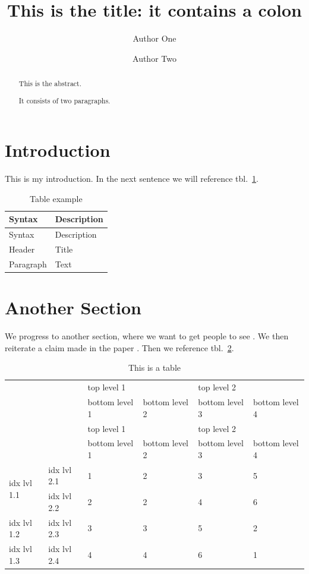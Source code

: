 \documentclass[
]{article}
\title{This is the title: it contains a colon}
\author{Author One \and Author Two}
\date{}
\begin{document}
\maketitle
\begin{abstract}
This is the abstract.

It consists of two paragraphs.
\end{abstract}

\hypertarget{introduction}{%
\section{Introduction}\label{introduction}}

This is my introduction. In the next sentence we will reference
tbl.~\ref{tbl:table1}.

\hypertarget{tbl:table1}{}
\begin{longtable}[]{@{}ll@{}}
\caption{\label{tbl:table1}Table example}\tabularnewline
\toprule
Syntax & Description \\
\midrule
\endfirsthead
\toprule
Syntax & Description \\
\midrule
\endhead
Header & Title \\
Paragraph & Text \\
\bottomrule
\end{longtable}

\hypertarget{another-section}{%
\section{Another Section}\label{another-section}}

We progress to another section, where we want to get people to see
\textcite{bhatt_linear_2006}. We then reiterate a claim made in the
paper \autocite{bhatt_linear_2006}. Then we reference
tbl.~\ref{tbl:table2}.

\hypertarget{tbl:table2}{}
\begin{longtable}[]{@{}llllll@{}}
\caption{\label{tbl:table2}This is a table}\tabularnewline
\toprule
& & \multicolumn{2}{l}{top level 1} & \multicolumn{2}{l}{top level 2} \\
& & bottom level 1 & bottom level 2 & bottom level 3 & bottom level 4 \\
\midrule
\endfirsthead
\toprule
& & \multicolumn{2}{l}{top level 1} & \multicolumn{2}{l}{top level 2} \\
& & bottom level 1 & bottom level 2 & bottom level 3 & bottom level 4 \\
\midrule
\endhead
\multirow{2}{*}{idx lvl 1.1} & idx lvl 2.1 & 1 & 2 & 3 & 5 \\
& idx lvl 2.2 & 2 & 2 & 4 & 6 \\
idx lvl 1.2 & idx lvl 2.3 & 3 & 3 & 5 & 2 \\
idx lvl 1.3 & idx lvl 2.4 & 4 & 4 & 6 & 1 \\
\bottomrule
\end{longtable}
\end{document}
